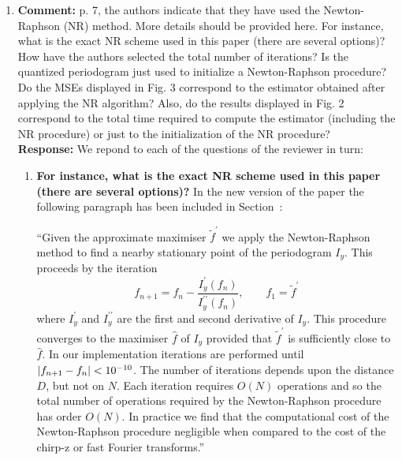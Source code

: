 \documentclass[a4paper,10pt]{article}
\begin{document}
\begin{enumerate}
\begin{enumerate}

\end{enumerate}

\item\textbf{Comment:}\label{com:rev1:nr}
p. 7, the authors indicate that they have used the Newton-Raphson (NR)
method. More details should be provided here. For instance, what is the exact
NR scheme used in this paper (there are several options)? How have the
authors selected the total number of iterations? Is the quantized periodogram
just used to initialize a Newton-Raphson procedure? Do the MSEs displayed
in Fig. 3 correspond to the estimator obtained after applying the NR algorithm?
Also, do the results displayed in Fig. 2 correspond to the total time
required to compute the estimator (including the NR procedure) or just to the
initialization of the NR procedure?
\\
\textbf{Response:}
We repond to each of the questions of the reviewer in turn:

\begin{enumerate}
\item \textbf{For instance, what is the exact NR scheme used in this paper (there are several options)?}  
In the new version of the paper the following paragraph has been included in Section~:

``Given the approximate maximiser $\widetilde{f}^\prime$ we apply the Newton-Raphson method to find a nearby stationary point of the periodogram $I_y$.  This proceeds by the iteration
\[
f_{n+1} = f_{n} - \frac{I_y^\prime(f_n)}{I_y^{\prime\prime}(f_n)}, \qquad f_{1} = \widetilde{f}^\prime
\]
where $I_y^\prime$ and $I_y^{\prime\prime}$ are the first and second derivative of $I_y$. This procedure converges to the maximiser $\hat{f}$ of $I_y$ provided that $\widetilde{f}^\prime$ is sufficiently close to $\hat{f}$.  In our implementation iterations are performed until $\vert f_{n+1}-f_n \vert < 10^{-10}$.  The number of iterations depends upon the distance $D$, but not on $N$.  Each iteration requires $O(N)$ operations and so the total number of operations required by the Newton-Raphson procedure has order $O(N)$.  In practice we find that the computational cost of the Newton-Raphson procedure negligible when compared to the cost of the chirp-z or fast Fourier transforms.''


\end{enumerate}
\end{enumerate}
\end{document}
